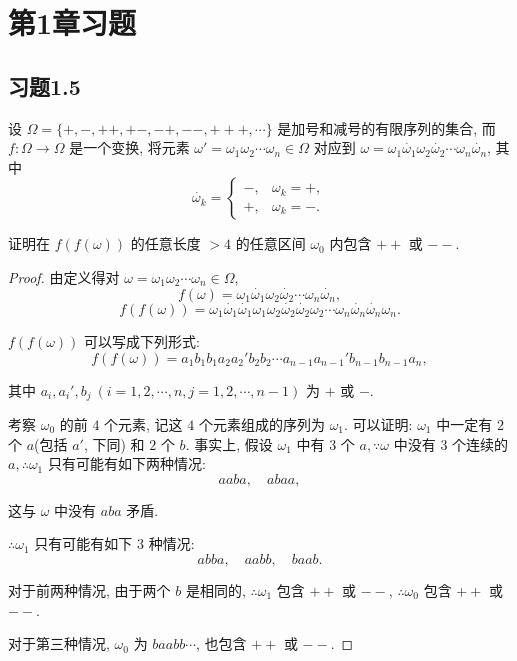 \documentclass[color=black,device=normal,lang=cn,mode=geye]{elegantnote}
\begin{document}
\section{第1章习题}
\subsection{习题1.5}
\setcounter{exsection}{5}
\begin{exercise}%
    设 $\Omega=\{+,-,++,+-,-+,--,+++,\cdots\}$ 是加号和减号的有限序列的集合, 而 $f:\Omega\to\Omega$ 是一个变换, 将元素 $\omega'=\omega_1\omega_2\cdots\omega_n\in\Omega$ 对应到 $\omega=\omega_1\dot{\omega_1}\omega_2\dot{\omega_2}\cdots\omega_n\dot{\omega_n}$, 其中
    \[\dot{\omega_k}=\begin{cases}
        -, & \omega_k=+, \\
        +, & \omega_k=-.
    \end{cases}\]
    
    证明在 $f(f(\omega))$ 的任意长度 $>4$ 的任意区间 $\omega_0$ 内包含 $++$ 或 $--$.    
\end{exercise}
\begin{proof}
    由定义得对 $\omega=\omega_1\omega_2\cdots\omega_n\in\Omega$,
    \[f(\omega)=\omega_1\dot{\omega_1}\omega_2\dot{\omega_2}\cdots\omega_n\dot{\omega_n},\]
    \[f(f(\omega))=\omega_1\dot{\omega_1}\dot{\omega_1}\omega_1\omega_2\dot{\omega_2}\dot{\omega_2}\omega_2\cdots\omega_n\dot{\omega_n}\dot{\omega_n}\omega_n.\]

    $f(f(\omega))$ 可以写成下列形式:
    \[f(f(\omega))=a_1b_1b_1a_2a_2'b_2b_2\cdots a_{n-1}a_{n-1}'b_{n-1}b_{n-1}a_n,\]

    其中 $a_i,a_i',b_j\ (i=1,2,\cdots,n,j=1,2,\cdots,n-1)$ 为 $+$ 或 $-$.

    考察 $\omega_0$ 的前 $4$ 个元素, 记这 $4$ 个元素组成的序列为 $\omega_1$. 可以证明: $\omega_1$ 中一定有 $2$ 个 $a$(包括 $a'$, 下同) 和 $2$ 个 $b$. 事实上, 假设 $\omega_1$ 中有 $3$ 个 $a,\because \omega$ 中没有 $3$ 个连续的 $a,\therefore \omega_1$ 只有可能有如下两种情况:
    \[aaba,\quad abaa,\]

    这与 $\omega$ 中没有 $aba$ 矛盾.

    $\therefore \omega_1$ 只有可能有如下 $3$ 种情况:
    \[abba,\quad aabb,\quad baab.\]

    对于前两种情况, 由于两个 $b$ 是相同的, $\therefore \omega_1$ 包含 $++$ 或 $--$, $\therefore \omega_0$ 包含 $++$ 或 $--$.

    对于第三种情况, $\omega_0$ 为 $baabb\cdots$, 也包含 $++$ 或 $--$.
\end{proof}
\end{document}
